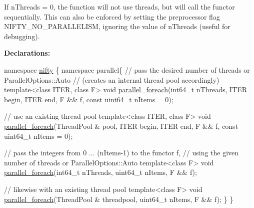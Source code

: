 If {\ttfamily n\+Threads = 0}, the function will not use threads, but will call the functor sequentially. This can also be enforced by setting the preprocessor flag {\ttfamily N\+I\+F\+T\+Y\+\_\+\+N\+O\+\_\+\+P\+A\+R\+A\+L\+L\+E\+L\+I\+S\+M}, ignoring the value of {\ttfamily n\+Threads} (useful for debugging).

{\bfseries  Declarations\+:}


\begin{DoxyCode}
\textcolor{keyword}{namespace }\hyperlink{namespacenifty}{nifty} \{
\textcolor{keyword}{namespace }parallel\{
    \textcolor{comment}{// pass the desired number of threads or ParallelOptions::Auto}
    \textcolor{comment}{// (creates an internal thread pool accordingly)}
    \textcolor{keyword}{template}<\textcolor{keyword}{class} ITER, \textcolor{keyword}{class} F>
    \textcolor{keywordtype}{void} \hyperlink{group__ParallelProcessing_ga505ac3d12ecde87341bce7b6f1027c88}{parallel\_foreach}(int64\_t nThreads,
                          ITER begin, ITER end,
                          F && f,
                          \textcolor{keyword}{const} uint64\_t nItems = 0);

    \textcolor{comment}{// use an existing thread pool}
    \textcolor{keyword}{template}<\textcolor{keyword}{class} ITER, \textcolor{keyword}{class} F>
    \textcolor{keywordtype}{void} \hyperlink{group__ParallelProcessing_ga505ac3d12ecde87341bce7b6f1027c88}{parallel\_foreach}(ThreadPool & pool,
                          ITER begin, ITER end,
                          F && f,
                          \textcolor{keyword}{const} uint64\_t nItems = 0);

    \textcolor{comment}{// pass the integers from 0 ... (nItems-1) to the functor f,}
    \textcolor{comment}{// using the given number of threads or ParallelOptions::Auto}
    \textcolor{keyword}{template}<\textcolor{keyword}{class} F>
    \textcolor{keywordtype}{void} \hyperlink{group__ParallelProcessing_ga505ac3d12ecde87341bce7b6f1027c88}{parallel\_foreach}(int64\_t nThreads,
                          uint64\_t nItems,
                          F && f);

    \textcolor{comment}{// likewise with an existing thread pool}
    \textcolor{keyword}{template}<\textcolor{keyword}{class} F>
    \textcolor{keywordtype}{void} \hyperlink{group__ParallelProcessing_ga505ac3d12ecde87341bce7b6f1027c88}{parallel\_foreach}(ThreadPool & threadpool,
                          uint64\_t nItems,
                          F && f);
\}
\}
\end{DoxyCode}


